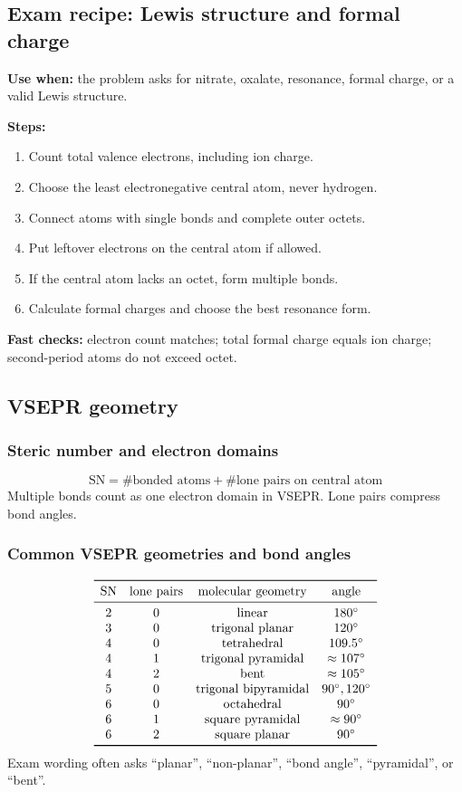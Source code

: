 \subsection{Exam recipe: Lewis structure and formal charge}
\textbf{Use when:} the problem asks for nitrate, oxalate, resonance, formal charge, or a valid Lewis structure.

\textbf{Steps:}
\begin{enumerate}
    \item Count total valence electrons, including ion charge.
    \item Choose the least electronegative central atom, never hydrogen.
    \item Connect atoms with single bonds and complete outer octets.
    \item Put leftover electrons on the central atom if allowed.
    \item If the central atom lacks an octet, form multiple bonds.
    \item Calculate formal charges and choose the best resonance form.
\end{enumerate}

\textbf{Fast checks:} electron count matches; total formal charge equals ion charge; second-period atoms do not exceed octet.

\subsection{VSEPR geometry}

\subsubsection{Steric number and electron domains}
\[
\mathrm{SN}=\#\text{bonded atoms}+\#\text{lone pairs on central atom}
\]
Multiple bonds count as one electron domain in VSEPR. Lone pairs compress bond angles.

\subsubsection{Common VSEPR geometries and bond angles}
\[
\begin{array}{c c c c}
\toprule
\mathrm{SN} & \text{lone pairs} & \text{molecular geometry} & \text{angle}\\
\midrule
2&0&\text{linear}&180^\circ\\
3&0&\text{trigonal planar}&120^\circ\\
4&0&\text{tetrahedral}&109.5^\circ\\
4&1&\text{trigonal pyramidal}&\approx107^\circ\\
4&2&\text{bent}&\approx105^\circ\\
5&0&\text{trigonal bipyramidal}&90^\circ,120^\circ\\
6&0&\text{octahedral}&90^\circ\\
6&1&\text{square pyramidal}&\approx90^\circ\\
6&2&\text{square planar}&90^\circ\\
\bottomrule
\end{array}
\]
Exam wording often asks ``planar'', ``non-planar'', ``bond angle'', ``pyramidal'', or ``bent''.

